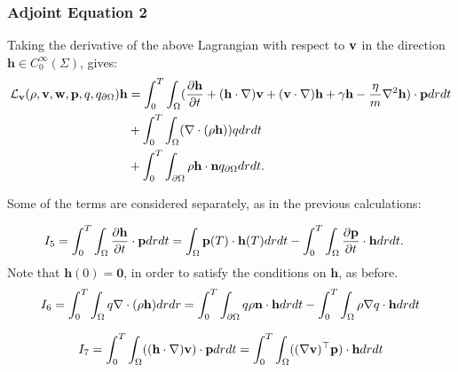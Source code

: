 \subsubsection{Adjoint Equation 2}

Taking the derivative of the above Lagrangian with respect to $\mathbf{v}$ in the direction $\mathbf{h} \in C_0^\infty(\Sigma)$, gives:
\begin{align*}
\mathcal{L}_{\mathbf{v}}(\rho,\mathbf{v},\mathbf{w},\mathbf{p},q,{q}_{\partial \Omega})\mathbf{h} &=  \int_0^T \int_\Omega ( \frac{\partial \mathbf{h} }{\partial t} +  (\mathbf{h} \cdot \nabla)\mathbf{v} +  (\mathbf{v} \cdot \nabla)\mathbf{h} +  \gamma \mathbf{h} - \frac{\eta}{m}\nabla^2 \mathbf{h}) \cdot \mathbf{p} dr dt\\
& + \int_0^T \int_\Omega ( \nabla \cdot (\rho \mathbf{h})) q dr dt\\ 
& +\int_0^T \int_{\partial\Omega} \rho \mathbf{h} \cdot \mathbf{n} {q}_{\partial \Omega} dr dt.
\end{align*}

Some of the terms are considered separately, as in the previous calculations:

\begin{align*}
I_5 &= \int_0^T \int_\Omega  \frac{\partial \mathbf{h} }{\partial t} \cdot \mathbf{p} dr dt = \int_\Omega \mathbf{p}(T) \cdot \mathbf{h}(T) dr dt  - \int_0^T \int_\Omega \frac{\partial \mathbf{p}}{\partial t} \cdot \mathbf{h} dr dt.
\end{align*}
Note that $\mathbf{h}(0)=\mathbf{0}$, in order to satisfy the conditions on $\mathbf{h}$, as before.
\begin{align*}
I_6= \int_0^T \int_\Omega q\nabla \cdot ( \rho \mathbf{h}) dr dr = \int_0^T \int_{\partial \Omega} q \rho  \mathbf{n}\cdot \mathbf{h} dr dt - \int_0^T \int_\Omega \rho \nabla q \cdot  \mathbf{h} dr dt
\end{align*}

\begin{align*}
I_7 = \int_0^T \int_\Omega  ((\mathbf{h} \cdot \nabla)\mathbf{v}) \cdot\mathbf{p} dr dt = \int_0^T \int_\Omega  ((\nabla \mathbf{v})^\top\mathbf{p}) \cdot  \mathbf{h} dr dt
\end{align*}

